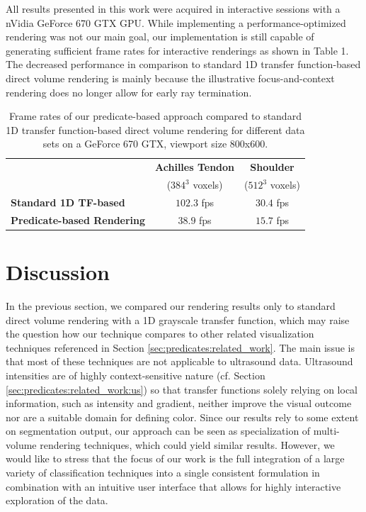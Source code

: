 All results presented in this work were acquired in interactive sessions with a nVidia GeForce 670 GTX GPU. 
While implementing a performance-optimized rendering was not our main goal, our implementation is still capable of generating sufficient frame rates for interactive renderings as shown in Table 1. 
The decreased performance in comparison to standard 1D transfer function-based direct volume rendering is mainly because the illustrative focus-and-context rendering does no longer allow for early ray termination. 

\begin{table}[th]
	\centering
	\begin{tabu} to 0.9
		\toprule
		                          & \bfseries Achilles Tendon & \bfseries Shoulder \\
		                          & ($384^3$ voxels)          & ($512^3$ voxels)   \\
		\midrule
		Standard 1D TF-based      & $102.3$ fps               & $30.4$ fps         \\
		Predicate-based Rendering & $38.9$ fps                & $15.7$ fps         \\
		\bottomrule
	\end{tabu}
	\label{tbl:predicates:fps}
	\caption{Frame rates of our predicate-based approach compared to standard 1D transfer function-based direct volume rendering for different data sets on a GeForce 670 GTX, viewport size $800$x$600$.}
\end{table}


\section*{Discussion}

In the previous section, we compared our rendering results only to standard direct volume rendering with a 1D grayscale transfer function, which may raise the question how our technique compares to other related visualization techniques referenced in Section \ref{sec:predicates:related_work}. 
The main issue is that most of these techniques are not applicable to ultrasound data.
Ultrasound intensities are of highly context-sensitive nature (cf. Section \ref{sec:predicates:related_work:us}) so that transfer functions solely relying on local information, such as intensity and gradient, neither improve the visual outcome nor are a suitable domain for defining color.
Since our results rely to some extent on segmentation output, our approach can be seen as specialization of multi-volume rendering techniques, which could yield similar results.
However, we would like to stress that the focus of our work is the full integration of a large variety of classification techniques into a single consistent formulation in combination with an intuitive user interface that allows for highly interactive exploration of the data.



